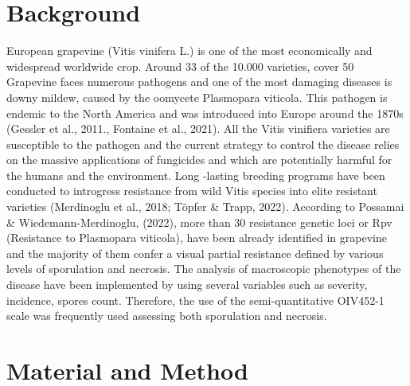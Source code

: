 \documentclass[english]{article}
\begin{document}

\begin{abstract}

\end{abstract}

\section{Background}
European grapevine (Vitis vinifera L.) is one of the most economically and widespread worldwide crop. Around 33 of the  10.000 varieties,  cover 50%
Grapevine faces numerous pathogens and one of the most damaging diseases is downy mildew, caused by the oomycete Plasmopara viticola. This pathogen is endemic to the North America and was introduced into Europe around the 1870s (Gessler et al., 2011., Fontaine et al., 2021). All the Vitis vinifiera varieties are susceptible to the pathogen and the current strategy to control the disease  relies on the massive applications of fungicides and which are potentially harmful for the humans and the environment. Long -lasting breeding programs have been conducted to introgress resistance from wild Vitis species into elite resistant varieties (Merdinoglu et al., 2018; Töpfer & Trapp, 2022). According to Possamai & Wiedemann-Merdinoglu, (2022), more than 30 resistance genetic loci or Rpv (Resistance to Plasmopara viticola), have been already identified in grapevine and the majority of them confer a visual partial resistance defined by various levels of sporulation and  necrosis. The analysis of macroscopic phenotypes of the disease have been implemented by using several variables such as severity, incidence, spores count. Therefore, the use of the semi-quantitative OIV452-1 scale was frequently used assessing both sporulation and necrosis.

\section{Material and Method}

\end{document}
